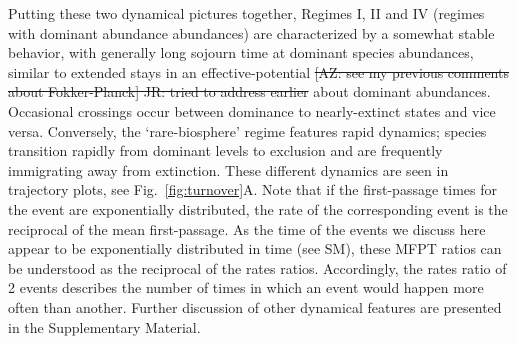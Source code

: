 \documentclass[9pt,twocolumn,twoside,lineno]{pnas-new}
\begin{document}
Putting these two dynamical pictures together, 
Regimes I, II and IV (regimes with dominant abundance abundances) are characterized by a somewhat stable behavior, with generally long sojourn time at dominant species abundances, similar to extended stays in an effective-potential \st{[AZ: see my previous comments about Fokker-Planck] JR: tried to address earlier} about dominant abundances.
Occasional crossings occur between dominance to nearly-extinct states and vice versa. 
Conversely, the `rare-biosphere' regime features rapid dynamics; species transition rapidly from dominant levels to exclusion and are frequently immigrating away from extinction. 
These different dynamics are seen in trajectory plots, see Fig.~\ref{fig:turnover}A. 
Note that if the first-passage times for the event are exponentially distributed, the rate of the corresponding event is the reciprocal of the mean first-passage.
As the time of the events we discuss here appear to be exponentially distributed in time (see SM), these MFPT ratios can be understood as the reciprocal of the rates ratios.
Accordingly, the rates ratio of 2 events describes the number of times in which an event would happen more often than another.
Further discussion of other dynamical features are presented in the Supplementary Material. 

 


\end{document}
